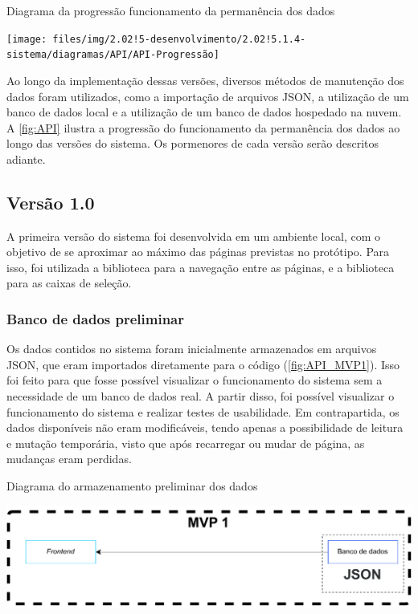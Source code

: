 \begin{MyCenteredFigure} \caption{Diagrama da progressão funcionamento da permanência dos dados} \label{fig:API}
  \texttt{[image: files/img/2.02!5-desenvolvimento/2.02!5.1.4-sistema/diagramas/API/API-Progressão]}
\end{MyCenteredFigure}

Ao longo da implementação dessas versões, diversos métodos de manutenção dos dados foram utilizados, como a importação de arquivos JSON, a utilização de um banco de dados local e a utilização de um banco de dados hospedado na nuvem. A \autoref{fig:API} ilustra a progressão do funcionamento da permanência dos dados ao longo das versões do sistema. Os pormenores de cada versão serão descritos adiante.

\subsection{Versão 1.0} \label{ssec:MVP1} %

A primeira versão do sistema foi desenvolvida em um ambiente local, com o objetivo de se aproximar ao máximo das páginas previstas no protótipo. Para isso, foi utilizada a biblioteca  para a navegação entre as páginas, e a biblioteca  para as caixas de seleção.

\subsubsection*{Banco de dados preliminar} \label{sssec:BDInicial}

Os dados contidos no sistema foram inicialmente armazenados em arquivos JSON, que eram importados diretamente para o código (\autoref{fig:API_MVP1}). Isso foi feito para que fosse possível visualizar o funcionamento do sistema sem a necessidade de um banco de dados real. A partir disso, foi possível visualizar o funcionamento do sistema e realizar testes de usabilidade. Em contrapartida, os dados disponíveis não eram modificáveis, tendo apenas a possibilidade de leitura e mutação temporária, visto que após recarregar ou mudar de página, as mudanças eram perdidas.

\begin{MyCenteredFigure} \caption{Diagrama do armazenamento preliminar dos dados} \label{fig:API_MVP1}
  \includegraphics[width=\textwidth]{files/img/2.02!5-desenvolvimento/2.02!5.1.4-sistema/diagramas/API/API_MVP1}
\end{MyCenteredFigure}

